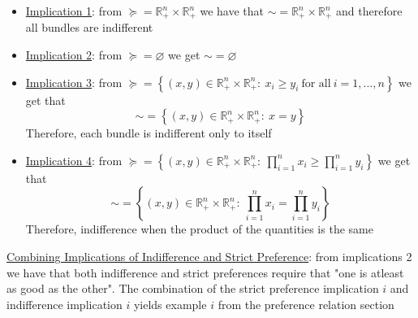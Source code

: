 \documentclass{article}
\begin{document}
  \begin{itemize}
    \item  \underline{Implication 1}: from $\succeq = \mathbb{R}_{+}^{n} \times \mathbb{R}_{+}^{n}$ we have that $\sim = \mathbb{R}_{+}^{n} \times \mathbb{R}_{+}^{n}$ and therefore all bundles are indifferent
    \item  \underline{Implication 2}: from $\succeq = \varnothing$ we get $\sim = \varnothing$
    \item  \underline{Implication 3}: from $\succeq = \left\{ (x,y) \in \mathbb{R}_{+}^{n} \times \mathbb{R}_{+}^{n}: \ x_{i} \geq y_{i} \ \text{for all} \ i = 1, \dots, n \right\}$ we get that $$\sim= \left\{ (x,y) \in \mathbb{R}_{+}^{n} \times \mathbb{R}_{+}^{n}: \ x = y \right\}$$Therefore, each bundle is indifferent only to itself
    \item  \underline{Implication 4}: from $\succeq = \left\{ (x,y) \in \mathbb{R}_{+}^{n} \times \mathbb{R}_{+}^{n}: \ \prod_{i=1}^{n} x_{i} \geq \prod_{i=1}^{n} y_{i} \right\}$ we get that $$\sim = \left\{ (x,y) \in \mathbb{R}_{+}^{n} \times \mathbb{R}_{+}^{n}: \ \prod_{i=1}^{n} x_{i} = \prod_{i=1}^{n} y_{i} \right\}$$Therefore, indifference when the product of the quantities is the same
  \end{itemize}
  \par
  \underline{Combining Implications of Indifference and Strict Preference}: from implications 2 we have that both indifference and strict preferences require that "one is atleast as good as the other". The combination of the strict preference implication $i$ and indifference implication $i$ yields example $i$ from the preference relation section \par
\vspace{6mm}
\end{document}
